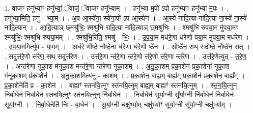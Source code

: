\documentclass[17pt]{extarticle}
\begin{document}
1. वाजꣳ॒॒ हनू᳚भ्याꣳ॒॒ हनू᳚भ्यां॒ ॅवाजं॒ ॅवाजꣳ॒॒ हनू᳚भ्याम् । . हनू᳚भ्या म॒पो॑ ऽपो हनू᳚भ्याꣳ॒॒ हनू᳚भ्या म॒पः । . हनू᳚भ्या॒मिति॒ हनु॑ - भ्या॒म् । . अ॒प आ॒स्ये॑ना॒ स्ये॑ना॒पो॑ ऽप आ॒स्ये॑न । . आ॒स्ये॑ नादि॒त्या ना॑दि॒त्या ना॒स्ये॑ ना॒स्ये॑ नादि॒त्यान् । . आ॒दि॒त्याञ् छ्मश्रु॑भिः॒ श्मश्रु॑भि रादि॒त्या ना॑दि॒त्याञ् छ्मश्रु॑भिः । . श्मश्रु॑भि रुपया॒म मु॑पया॒मꣳ श्मश्रु॑भिः॒ श्मश्रु॑भि रुपया॒मम् । . श्मश्रु॑भि॒रिति॒ श्मश्रु॑ - भिः॒ । . उ॒प॒या॒म मध॑रे॒णा ध॑रेणो पया॒म मु॑पया॒म मध॑रेण । . उ॒प॒या॒ममित्यु॑प - या॒मम् । . अध॑रे॒ णौष्ठे॒ नौष्ठे॒ना ध॑रे॒णा ध॑रे॒णौ ष्ठे॑न । . ओष्ठे॑न॒ सथ् सदोष्ठे॒ नौष्ठे॑न॒ सत् । . सदुत्त॑रे॒णो त्त॑रेण॒ सथ् सदुत्त॑रेण । . उत्त॑रे॒णा न्त॑रे॒णा न्त॑रे॒णो त्त॑रे॒णो त्त॑रे॒णा न्त॑रेण । . उत्त॑रे॒णेत्युत् - त॒रे॒ण॒ । . अन्त॑रेणा नूका॒श म॑नूका॒श मन्त॑रे॒णा न्त॑रेणा नूका॒शम् । . अ॒नू॒का॒शम् प्र॑का॒शेन॑ प्रका॒शेना॑ नूका॒श म॑नूका॒शम् प्र॑का॒शेन॑ । . अ॒नू॒का॒शमित्य॑नु - का॒शम् । . प्र॒का॒शेन॒ बाह्य॒म् बाह्य॑म् प्रका॒शेन॑ प्रका॒शेन॒ बाह्य᳚म् । . प्र॒का॒शेनेति॑ प्र - का॒शेन॑ । . बाह्यꣳ॑ स्तनयि॒त्नुꣳ स्त॑नयि॒त्नुम् बाह्य॒म् बाह्यꣳ॑ स्तनयि॒त्नुम् । . स्त॒न॒यि॒त्नुन् नि॑र्बा॒धेन॑ निर्बा॒धेन॑ स्तनयि॒त्नुꣳ स्त॑नयि॒त्नुन् नि॑र्बा॒धेन॑ । . नि॒र्बा॒धेन॑ सूर्या॒ग्नी सू᳚र्या॒ग्नी नि॑र्बा॒धेन॑ निर्बा॒धेन॑ सूर्या॒ग्नी । . नि॒र्बा॒धेनेति॑ निः - बा॒धेन॑ । . सू॒र्या॒ग्नी चक्षु॑र्भ्या॒म् चक्षु॑र्भ्याꣳ सूर्या॒ग्नी सू᳚र्या॒ग्नी चक्षु॑र्भ्याम् । \newline
\end{document}

